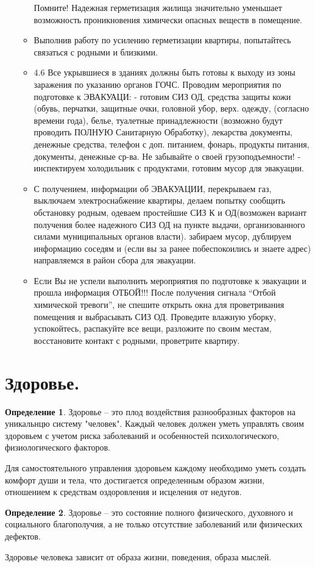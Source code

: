 \documentclass[a4paper, 12pt]{article}
\theoremstyle{definition}
\newtheorem*{definition}{Определение}
\begin{document}
\begin{enumerate}
\begin{itemize}
                Помните! Надежная герметизация жилища значительно уменьшает возможность проникновения химически опасных веществ в помещение.
                \item Выполнив работу по усилению герметизации квартиры, попытайтесь связаться с родными и близкими.
                \item         4.6 Все укрывшиеся в зданиях должны быть готовы к выходу из зоны заражения по указанию органов ГОЧС. Проводим мероприятия по подготовке к ЭВАКУАЦИ:
                - готовим СИЗ ОД, средства защиты кожи (обувь, перчатки, защитные очки, головной убор, верх. одежду, (согласно времени года), белье, туалетные принадлежности (возможно будут проводить  ПОЛНУЮ Санитарную Обработку), лекарства документы, денежные средства, телефон с доп. питанием, фонарь, продукты питания, документы, денежные ср-ва. Не забывайте о своей грузоподъемности!
                - инспектируем холодильник с продуктами, готовим мусор для эвакуации.
                \item С получением, информации об ЭВАКУАЦИИ, перекрываем газ,  выключаем электроснабжение квартиры, делаем попытку сообщить обстановку родным, одеваем простейшие СИЗ К и ОД(возможен вариант получения более надежного СИЗ ОД на пункте выдачи, организованного силами муниципальных органов власти).   забираем мусор, дублируем информацию соседям и (если  вы за ранее побеспокоились и знаете адрес)   направляемся в район сбора для эвакуации. 
                \item Если Вы не успели выполнить мероприятия по подготовке к эвакуации и прошла информация ОТБОЙ!!! 
                После получения сигнала “Отбой химической тревоги”, не спешите открыть окна для проветривания помещения и 
                 выбрасывать СИЗ ОД.  Проведите влажную уборку, успокойтесь, распакуйте все вещи, разложите по своим местам, восстановите контакт с родными, проветрите квартиру. 
            \end{itemize}

            
        \end{enumerate}
        

        \section{Здоровье.}
        \begin{definition}
            Здоровье -- это плод воздействия разнообразных факторов на уникальнцю систему "человек". Каждый человек должен уметь управлять своим здоровьем с учетом риска заболеваний и особенностей психологического, физиологического факторов.
        \end{definition}
        Для самостоятельного управления здоровьем каждому необходимо уметь создать комфорт души и тела, что достигается определенным образом жизни, отношением к средствам оздоровления и исцеления от недугов.
        \begin{definition}
            Здоровье -- это состояние полного физического, духовного и социального благополучия, а не только отсутствие заболеваний или физических дефектов.
        \end{definition}
        Здоровье человека зависит от образа жизни, поведения, образа мыслей.
\end{document}
